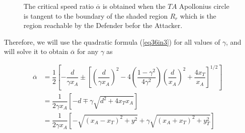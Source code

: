\begin{figure}
\centering
{}\label{4_g<1}
\quad
{}\label{4_g=1}
\quad
{}\label{4_g>1}
\caption{The critical speed ratio $\overline{\alpha}$ is obtained when the $TA$ Apollonius circle is tangent to the boundary of the shaded region $R_r$ which is the region reachable by the Defender befor the Attacker.}
\label{CSR}
\end{figure}


Therefore, we will use the quadratic formula (\ref{eq36in3}) for all values of $\gamma$, and will solve it to obtain $\overline{\alpha}$ for any $\gamma$ as 

\begin{equation}
\begin{split}
\overline{\alpha}&=\dfrac{1}{2}[-\dfrac{d}{\gamma x_{A}}
\pm[(\dfrac{d}{\gamma x_{A}})^{2}-4(\dfrac{1-\gamma^{2}}{4\gamma^{2}})(\dfrac{d}{x_{A}})^{2}+\dfrac{4x_{T}}{x_{A}}]^{1/2} ]\\
&= \dfrac{1}{2\gamma x_{A}} [-d \mp \gamma \sqrt{d^{2}+4 x_{T} x_{A}}]\\
&= \dfrac{1}{2 \gamma x_{A}} [- \sqrt{(x_{A}-x_{T})^{2} + y^{2}}+ \gamma \sqrt{(x_{A}+ x_{T})^{2}+y_{T}^{2}}]
\end{split}
\label{cr_alpha_3}
\end{equation}






